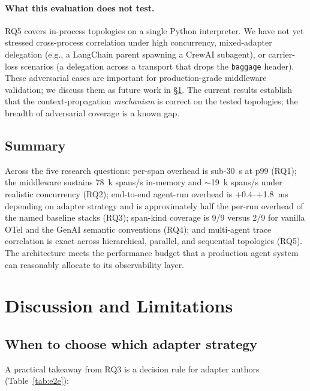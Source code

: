 \documentclass[sigconf,review,anonymous,9pt]{acmart}
\begin{document}
\paragraph{What this evaluation does not test.}
RQ5 covers in-process topologies on a single Python interpreter.
We have not yet stressed cross-process correlation under high
concurrency, mixed-adapter delegation (e.g., a LangChain parent
spawning a CrewAI subagent), or carrier-loss scenarios (a delegation
across a transport that drops the \texttt{baggage} header). These
adversarial cases are important for production-grade middleware
validation; we discuss them as future work in
\S\ref{sec:discussion}. The current results establish that the
context-propagation \emph{mechanism} is correct on the tested
topologies; the breadth of adversarial coverage is a known gap.

\subsection{Summary}

Across the five research questions: per-span overhead is sub-30~\textmu s
at p99 (RQ1); the middleware sustains 78~k spans/s in-memory and
$\sim$19~k spans/s under realistic concurrency (RQ2); end-to-end
agent-run overhead is $+$0.4--$+$1.8~ms depending on adapter strategy
and is approximately half the per-run overhead of the named baseline
stacks (RQ3); span-kind coverage is 9/9 versus 2/9 for vanilla OTel
and the GenAI semantic conventions (RQ4); and multi-agent trace
correlation is exact across hierarchical, parallel, and sequential
topologies (RQ5). The architecture meets the performance budget that
a production agent system can reasonably allocate to its observability
layer.

\section{Discussion and Limitations}
\label{sec:discussion}

\subsection{When to choose which adapter strategy}

A practical takeaway from RQ3 is a decision rule for adapter authors
(Table~\ref{tab:e2e}):
\end{document}
